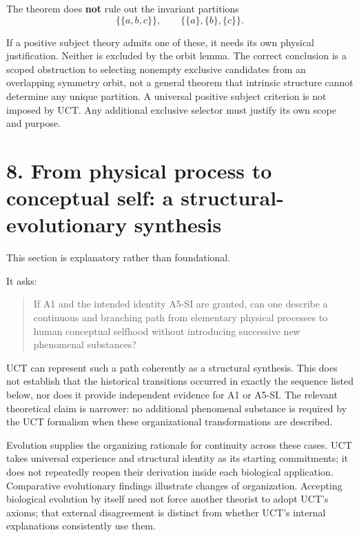 \documentclass[
  11pt,
  a4paper,
]{article}
\begin{document}
The theorem does \textbf{not} rule out the invariant partitions
\nopagebreak[4]
\[
\bigl\{\{a,b,c\}\bigr\},\qquad
\bigl\{\{a\},\{b\},\{c\}\bigr\}.
\]

If a positive subject theory admits one of these, it needs its own
physical justification. Neither is excluded by the orbit lemma. The
correct conclusion is a scoped obstruction to selecting nonempty
exclusive candidates from an overlapping symmetry orbit, not a general
theorem that intrinsic structure cannot determine any unique partition.
A universal positive subject criterion is not imposed by UCT. Any
additional exclusive selector must justify its own scope and purpose.

\hypertarget{from-physical-process-to-conceptual-self-a-structural-evolutionary-synthesis}{%
\section{8. From physical process to conceptual self: a
structural-evolutionary
synthesis}\label{from-physical-process-to-conceptual-self-a-structural-evolutionary-synthesis}}

This section is explanatory rather than foundational.

It asks:

\begin{quote}
If A1 and the intended identity A5-SI are granted, can one describe a
continuous and branching path from elementary physical processes to
human conceptual selfhood without introducing successive new phenomenal
substances?
\end{quote}

UCT can represent such a path coherently as a structural synthesis. This
does not establish that the historical transitions occurred in exactly
the sequence listed below, nor does it provide independent evidence for
A1 or A5-SI. The relevant theoretical claim is narrower: no additional
phenomenal substance is required by the UCT formalism when these
organizational transformations are described.

Evolution supplies the organizing rationale for continuity across these
cases. UCT takes universal experience and structural identity as its
starting commitments; it does not repeatedly reopen their derivation
inside each biological application. Comparative evolutionary findings
illustrate changes of organization. Accepting biological evolution by
itself need not force another theorist to adopt UCT's axioms; that
external disagreement is distinct from whether UCT's internal
explanations consistently use them.
\end{document}
